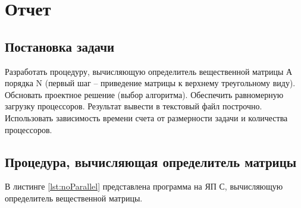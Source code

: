 \documentclass[12pt, a4paper]{article}
\begin{document}

	
\section{Отчет}
	
\subsection{Постановка задачи}
	
Разработать процедуру, вычисляющую определитель вещественной матрицы А порядка N (первый шаг -- приведение матрицы к верхнему треугольному виду). Обсновать проектное решение (выбор алгоритма). Обеспечить равномерную загрузку процессоров. Результат вывести в текстовый файл построчно. Использовать зависимость времени счета от размерности задачи и количества процессоров.
	
\subsection{Процедура, вычисляющая определитель матрицы}
	
В листинге \ref{lst:noParallel} представлена программа на ЯП С, вычисляющую определитель вещественной матрицы.
	
\end{document}
